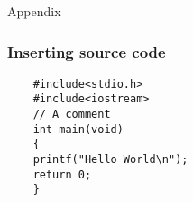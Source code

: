 \documentclass[12pt,t]{beamer}
\begin{document}
\begin{frame}{Appendix}

\end{frame}



\begin{frame}[fragile]
\frametitle{Inserting source code}
\begin{lstlisting}
    #include<stdio.h>
    #include<iostream>
    // A comment
    int main(void)
    {
    printf("Hello World\n");
    return 0;
    }
\end{lstlisting}
\end{frame}
\end{document}
